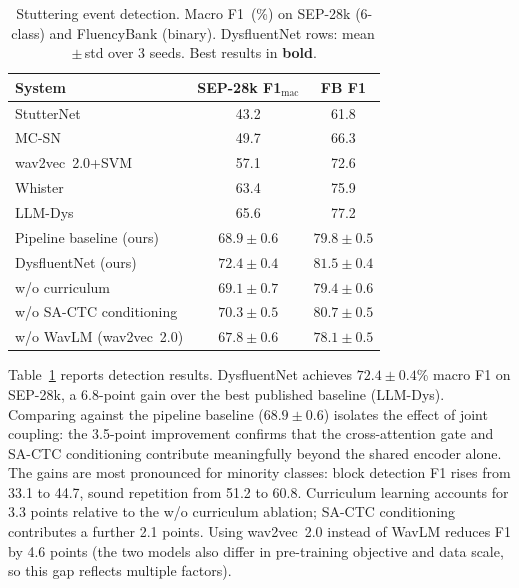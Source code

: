 \documentclass[cameraready]{Interspeech}
\begin{document}
\begin{table}[t]
    \centering
    \caption{Stuttering event detection. Macro F1~(\%) on SEP-28k (6-class)
    and FluencyBank (binary). DysfluentNet rows: mean\,$\pm$\,std over 3 seeds.
    Best results in \textbf{bold}.}
    \label{tab:detection}
    \renewcommand{\arraystretch}{1.1}
    \begin{tabular}{lcc}
        \toprule
        \textbf{System}
            & \textbf{SEP-28k F1$_\text{mac}$}
            & \textbf{FB F1} \\
        \midrule
        StutterNet~\cite{sheikh2021stutternet}       & 43.2 & 61.8 \\
        MC-SN~\cite{sheikh2023advancing}             & 49.7 & 66.3 \\
        wav2vec~2.0+SVM~\cite{bayerl2022detecting}   & 57.1 & 72.6 \\
        Whister~\cite{changawala2024whister}          & 63.4 & 75.9 \\
        LLM-Dys~\cite{wagner2024llm}                 & 65.6 & 77.2 \\
        \midrule
        Pipeline baseline (ours)
            & $68.9 \pm 0.6$ & $79.8 \pm 0.5$ \\
        DysfluentNet (ours)
            & $\mathbf{72.4 \pm 0.4}$ & $\mathbf{81.5 \pm 0.4}$ \\
        \quad w/o curriculum
            & $69.1 \pm 0.7$ & $79.4 \pm 0.6$ \\
        \quad w/o SA-CTC conditioning
            & $70.3 \pm 0.5$ & $80.7 \pm 0.5$ \\
        \quad w/o WavLM (wav2vec~2.0)
            & $67.8 \pm 0.6$ & $78.1 \pm 0.5$ \\
        \bottomrule
    \end{tabular}
\end{table}

Table~\ref{tab:detection} reports detection results. DysfluentNet achieves
$72.4 \pm 0.4$\% macro F1 on SEP-28k, a 6.8-point gain over the best published
baseline (LLM-Dys). Comparing against the pipeline baseline ($68.9 \pm 0.6$)
isolates the effect of joint coupling: the 3.5-point improvement confirms that
the cross-attention gate and SA-CTC conditioning contribute meaningfully beyond
the shared encoder alone. The gains are most pronounced for minority classes:
block detection F1 rises from 33.1 to 44.7, sound repetition from 51.2 to
60.8. Curriculum learning accounts for 3.3 points relative to the w/o
curriculum ablation; SA-CTC conditioning contributes a further 2.1 points.
Using wav2vec~2.0 instead of WavLM reduces F1 by 4.6 points (the two models
also differ in pre-training objective and data scale, so this gap reflects
multiple factors).
\end{document}

